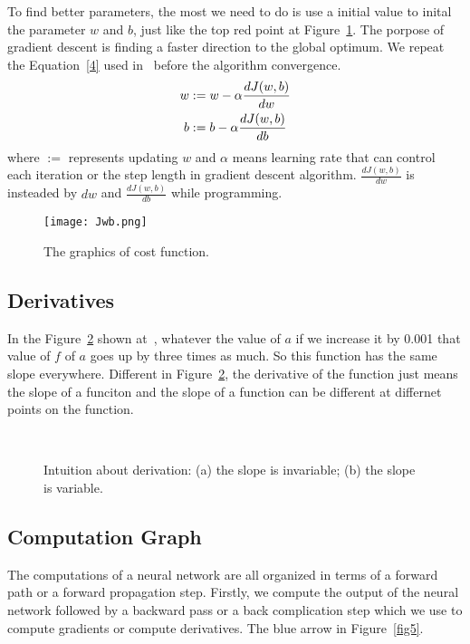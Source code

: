 \documentclass[a4paper]{article}
\begin{document}
To find better parameters, the most we need to do is use a initial value to inital the parameter $w$ and $b$, just like the top red point at Figure~\ref{fig3}. The porpose of gradient descent is finding a faster direction to the global optimum. We repeat the Equation~\ref{4} used in~\cite{Neural} before the algorithm convergence. \\
\begin{gather}
\label{4}
w := w - \alpha\frac{dJ(w,b)}{dw}\\ \notag
b := b - \alpha\frac{dJ(w,b)}{db}
\end{gather}
where $:=$ represents updating $w$ and $\alpha$ means learning rate that can control each iteration or the step length in gradient descent algorithm. $\frac{dJ(w,b)}{dw}$ is insteaded by $dw$ and $\frac{dJ(w,b)}{db}$ while programming.

\begin{figure}[hb]
\centering
\texttt{[image: Jwb.png]}
\caption{The graphics of cost function.}
\label{fig3}
\end{figure}

\subsection{Derivatives}

In the Figure~\ref{fig4} shown at~\cite{Neural}, whatever the value of $a$ if we increase it by 0.001 that value of $f$ of $a$ goes up by three times as much. So this function has the same slope everywhere. Different in Figure~\ref{fig4}, the derivative of the function just means the slope of a funciton and the slope of a function can be different at differnet points on the function.

\begin{figure}[hb]
  \centering
  \quad
  \\
   \caption{Intuition about derivation: (a) the slope is invariable; (b) the slope is variable.}
  \label{fig4}
\end{figure} 

\subsection{Computation Graph}

The computations of a neural network are all organized in terms of a forward path or a forward propagation step. Firstly, we compute the output of the neural network followed by a backward pass or a back complication step which we use to compute gradients or compute derivatives. The blue arrow in Figure~\ref{fig5}.
\end{document}
